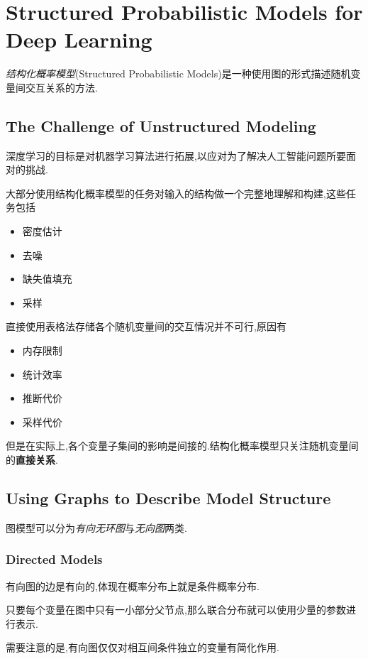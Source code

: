 \chapter{Structured Probabilistic Models for Deep Learning}

\textit{结构化概率模型}(Structured Probabilistic Models)是一种使用图的形式描述随机变量间交互关系的方法.

\section{The Challenge of Unstructured Modeling}

深度学习的目标是对机器学习算法进行拓展,以应对为了解决人工智能问题所要面对的挑战.

大部分使用结构化概率模型的任务对输入的结构做一个完整地理解和构建,这些任务包括
\begin{itemize}
    \item 密度估计
    \item 去噪
    \item 缺失值填充
    \item 采样
\end{itemize}

直接使用表格法存储各个随机变量间的交互情况并不可行,原因有
\begin{itemize}
    \item 内存限制
    \item 统计效率
    \item 推断代价
    \item 采样代价
\end{itemize}
但是在实际上,各个变量子集间的影响是间接的.结构化概率模型只关注随机变量间的\textbf{直接关系}.

\section{Using Graphs to Describe Model Structure}

图模型可以分为\textit{有向无环图}与\textit{无向图}两类.

\subsection{Directed Models}

有向图的边是有向的,体现在概率分布上就是条件概率分布.

只要每个变量在图中只有一小部分父节点,那么联合分布就可以使用少量的参数进行表示.

需要注意的是,有向图仅仅对相互间条件独立的变量有简化作用.

